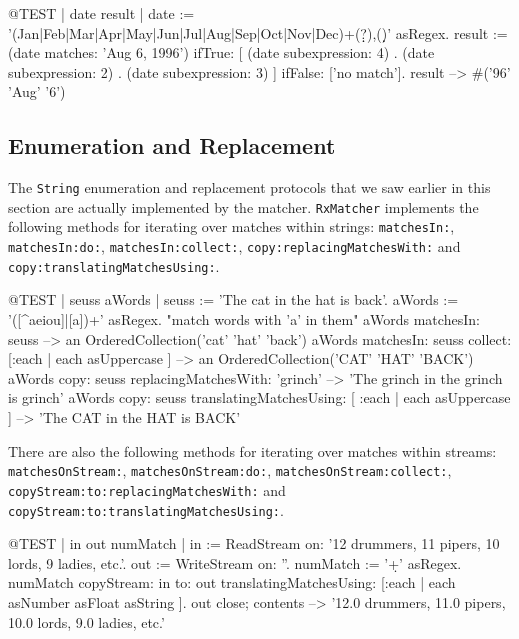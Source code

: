 \documentclass[10pt,twoside,chapterprefix=false]{scrbook}
\renewcommand{\ct}{\lstinline[mathescape=false,basicstyle={\sffamily\upshape}]}
\begin{document}
{\begin{ToSh-code}{@TEST | date result |}
date := '(Jan|Feb|Mar|Apr|May|Jun|Jul|Aug|Sep|Oct|Nov|Dec)\s+(\d\d?)\s*,(\d\d)' asRegex.
result := (date matches: 'Aug 6, 1996')
       ifTrue: [{ (date subexpression: 4) .
				(date subexpression: 2) .
				(date subexpression: 3) } ]
        ifFalse: ['no match'].
result --> #('96' 'Aug' '6')
\end{ToSh-code}

\subsection{Enumeration and Replacement}

The \ct{String} enumeration and replacement protocols that we saw earlier in this section are actually implemented by the matcher.
\ct{RxMatcher} implements the following methods for iterating over matches within strings:
\ct{matchesIn:},
\ct{matchesIn:do:},
\ct{matchesIn:collect:},
\ct{copy:replacingMatchesWith:} and
\ct{copy:translatingMatchesUsing:}.

\begin{ToSh-code}{@TEST | seuss aWords |}
seuss := 'The cat in the hat is back'.
aWords := '\<([^aeiou]|[a])+\>' asRegex.    "match words with 'a' in them"
aWords matchesIn: seuss                                                                                     --> an OrderedCollection('cat' 'hat' 'back')
aWords matchesIn: seuss collect: [:each | each asUppercase ]                          --> an OrderedCollection('CAT' 'HAT' 'BACK')
aWords copy: seuss replacingMatchesWith: 'grinch'                                           --> 'The grinch in the grinch is grinch'
aWords copy: seuss translatingMatchesUsing: [ :each | each asUppercase ]     --> 'The CAT in the HAT is BACK'
\end{ToSh-code}

There are also the following methods for iterating over matches within streams:
\ct{matchesOnStream:},
\ct{matchesOnStream:do:},
\ct{matchesOnStream:collect:},
\ct{copyStream:to:replacingMatchesWith:} and
\ct{copyStream:to:translatingMatchesUsing:}.

\begin{ToSh-code}{@TEST | in out numMatch |}
in := ReadStream on: '12 drummers, 11 pipers, 10 lords, 9 ladies, etc.'.
out := WriteStream on: ''.
numMatch := '\<\d+\>' asRegex.
numMatch
  copyStream: in
  to: out
  translatingMatchesUsing: [:each | each asNumber asFloat asString ].
out close; contents --> '12.0 drummers, 11.0 pipers, 10.0 lords, 9.0 ladies, etc.'
\end{ToSh-code}


}
\end{document}
